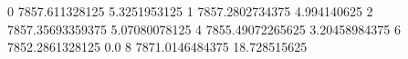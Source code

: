 0 7857.611328125 5.3251953125
1 7857.2802734375 4.994140625
2 7857.35693359375 5.07080078125
4 7855.49072265625 3.20458984375
6 7852.2861328125 0.0
8 7871.0146484375 18.728515625
